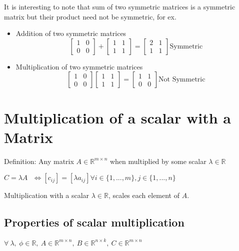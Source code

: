 \documentclass{article}
\begin{document}
It is interesting to note that sum of two symmetric matrices is a symmetric matrix but their product need not be symmetric, for ex. 
\begin{itemize} 
    \item  Addition of two symmetric matrices
    \[   \begin{bmatrix}
        1 & 0\\
        0 & 0
    \end{bmatrix} + \begin{bmatrix}
        1 & 1\\
        1 & 1
    \end{bmatrix} = \begin{bmatrix}
        2 & 1\\
        1 & 1
    \end{bmatrix} \nonumber \text{Symmetric}
\]
\item Multiplication of two symmetric matrices
\[
    \begin{bmatrix}
        1 & 0\\
        0 & 0
    \end{bmatrix}\begin{bmatrix}
        1 & 1\\
        1 & 1
    \end{bmatrix} = \begin{bmatrix}
        1 & 1\\
        0 & 0
    \end{bmatrix} \nonumber \text{Not Symmetric}
\]
    
\end{itemize}

\section{Multiplication of a scalar with a Matrix}
Definition: Any matrix \(A \in \mathbb{R} ^{m \times n}\) when multiplied by some scalar \(\lambda \in \mathbb{R}\)

\begin{math}
     C = \lambda A ~~~ \iff [c_{ij}] = [\lambda a_{ij}] \forall i \in \{1,...,m\}, j\in \{1,...,n\}
\end{math}

Multiplication with a scalar \(\lambda \in \mathbb{R}\), scales each element of \(A\).

\subsection{Properties of scalar multiplication}
\(\forall~ \lambda,~\phi \in \mathbb{R},~A \in \mathbb{R}^{m\times n},~B \in \mathbb{R}^{n\times k},~C \in \mathbb{R}^{m\times n}\)
\end{document}
